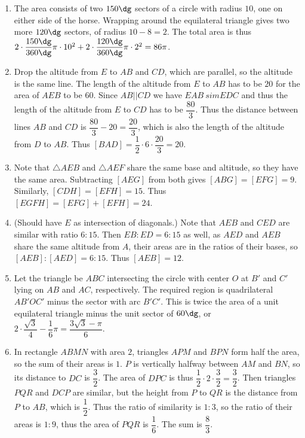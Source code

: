 \documentclass[10pt,paper=letter]{scrartcl}
\begin{document}
\begin{enumerate}

\item The area consists of two $150\dg$ sectors of a circle with radius $10$, one on either side of the horse. Wrapping around the equilateral triangle gives two more $120\dg$ sectors, of radius $10 - 8 = 2$. The total area is thus $2 \cdot \dfrac{150\dg}{360\dg} \pi \cdot 10^2 + 2 \cdot \dfrac{120\dg}{360\dg} \pi \cdot 2^2 = 86\pi$.

\item Drop the altitude from $E$ to $AB$ and $CD$, which are parallel, so the altitude is the same line. The length of the altitude from $E$ to $AB$ has to be $20$ for the area of $AEB$ to be $60$. Since $AB || CD$ we have $EAB \ sim EDC$ and thus the length of the altitude from $E$ to $CD$ has to be $\dfrac{80}3$. Thus the distance between lines $AB$ and $CD$ is $\dfrac{80}3 - 20 = \dfrac{20}3$, which is also the length of the altitude from $D$ to $AB$. Thus $[BAD] = \dfrac12 \cdot 6 \cdot \dfrac{20}3 = 20$.

\item Note that $\triangle AEB$ and $\triangle AEF$ share the same base and altitude, so they have the same area. Subtracting $[AEG]$ from both gives $[ABG] = [EFG] = 9$. Similarly, $[CDH] = [EFH] = 15$. Thus $[EGFH] = [EFG] + [EFH] = 24$.

\item (Should have $E$ as intersection of diagonals.) Note that $AEB$ and $CED$ are similar with ratio $6 : 15$. Then $EB : ED = 6 : 15$ as well, as $AED$ and $AEB$ share the same altitude from $A$, their areas are in the ratios of their bases, so $[AEB] : [AED] = 6 : 15$. Thus $[AEB] = 12$.

\item Let the triangle be $ABC$ intersecting the circle with center $O$ at $B'$ and $C'$ lying on $AB$ and $AC$, respectively. The required region is quadrilateral $AB'OC'$ minus the sector with arc $B'C'$. This is twice the area of a unit equilateral triangle minus the unit sector of $60\dg$, or $2 \cdot \dfrac{\sqrt{3}}4 - \dfrac16\pi = \dfrac{3\sqrt3 - \pi}6$.

\item In rectangle $ABMN$ with area $2$, triangles $APM$ and $BPN$ form half the area, so the sum of their areas is $1$. $P$ is vertically halfway between $AM$ and $BN$, so its distance to $DC$ is $\dfrac32$. The area of $DPC$ is thus $\dfrac12 \cdot 2 \cdot \dfrac32 = \dfrac32$. Then triangles $PQR$ and $DCP$ are similar, but the height from $P$ to $QR$ is the distance from $P$ to $AB$, which is $\dfrac12$. Thus the ratio of similarity is $1 : 3$, so the ratio of their areas is $1 : 9$, thus the area of $PQR$ is $\dfrac16$. The sum is $\dfrac83$.


\end{enumerate}
\end{document}
